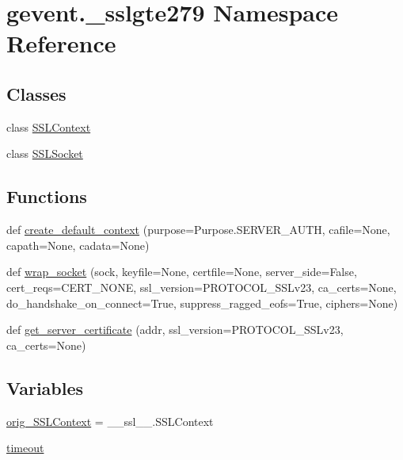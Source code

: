 \hypertarget{namespacegevent_1_1__sslgte279}{}\section{gevent.\+\_\+sslgte279 Namespace Reference}
\label{namespacegevent_1_1__sslgte279}
\subsection*{Classes}
\begin{DoxyCompactItemize}
\item 
class \hyperlink{classgevent_1_1__sslgte279_1_1_s_s_l_context}{S\+S\+L\+Context}
\item 
class \hyperlink{classgevent_1_1__sslgte279_1_1_s_s_l_socket}{S\+S\+L\+Socket}
\end{DoxyCompactItemize}
\subsection*{Functions}
\begin{DoxyCompactItemize}
\item 
def \hyperlink{namespacegevent_1_1__sslgte279_a3b13b1f1795f96a3d30958d39dda5f4f}{create\+\_\+default\+\_\+context} (purpose=Purpose.\+S\+E\+R\+V\+E\+R\+\_\+\+A\+U\+TH, cafile=None, capath=None, cadata=None)
\item 
def \hyperlink{namespacegevent_1_1__sslgte279_affdbe49ecfb55ee9d3aa0bfd562b7ecf}{wrap\+\_\+socket} (sock, keyfile=None, certfile=None, server\+\_\+side=False, cert\+\_\+reqs=C\+E\+R\+T\+\_\+\+N\+O\+NE, ssl\+\_\+version=P\+R\+O\+T\+O\+C\+O\+L\+\_\+\+S\+S\+Lv23, ca\+\_\+certs=None, do\+\_\+handshake\+\_\+on\+\_\+connect=True, suppress\+\_\+ragged\+\_\+eofs=True, ciphers=None)
\item 
def \hyperlink{namespacegevent_1_1__sslgte279_ac5f054164ee9c0ac0584e98c553bc656}{get\+\_\+server\+\_\+certificate} (addr, ssl\+\_\+version=P\+R\+O\+T\+O\+C\+O\+L\+\_\+\+S\+S\+Lv23, ca\+\_\+certs=None)
\end{DoxyCompactItemize}
\subsection*{Variables}
\begin{DoxyCompactItemize}
\item 
\hyperlink{namespacegevent_1_1__sslgte279_a533dbd6f25478242a5aea158a3c94a38}{orig\+\_\+\+S\+S\+L\+Context} = \+\_\+\+\_\+ssl\+\_\+\+\_\+.\+S\+S\+L\+Context
\item 
\hyperlink{namespacegevent_1_1__sslgte279_abe03f65ebcf73a43ea674931d80e3309}{timeout}
\end{DoxyCompactItemize}


